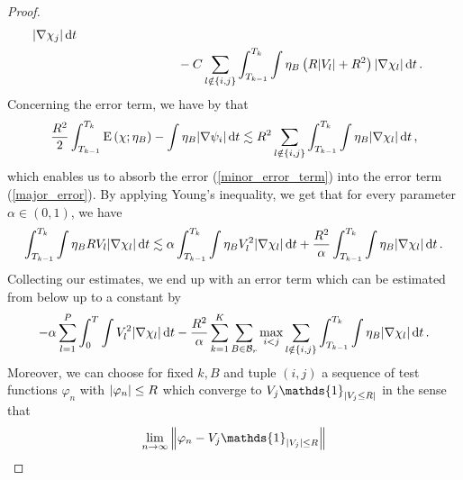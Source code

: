 \begin{proof}
\begin{align}
		\abs{ \nabla \chi_{ j } }
		\dd{ t }
		\\
		\label{major_error}
		& \qquad \qquad \qquad \qquad -
		C \sum_{ l \notin \{ i , j \} }
		\int_{ T_{ k - 1 } }^{ T_{ k } }
			\int
				\eta_{ B } 
				\left(
					R \abs{ V_{ l } }
					+
					R^{ 2 }
				\right)
			\abs{ \nabla \chi_{ l } }
		\dd{ t }.
	\end{align}
	Concerning the error term, we have by  
	that
	\begin{equation*}
				\frac{ R^{ 2 } }{ 2 }
		\int_{ T_{ k - 1 } }^{ T_{ k } }
		\operatorname{E} \left( \chi ; \eta_{ B } \right)
		-
		\int
		\eta_{ B }
		\abs{ \nabla \psi_{ i } }
		\dd{ t }
		\lesssim
		R^{ 2 }
		\sum_{ l \notin \{ i , j \} }
		\int_{ T_{ k - 1 } }^{ T_{ k } }
		\int
		\eta_{ B }
		\abs{ \nabla \chi_{ l } }
		\dd{ t },
	\end{equation*}
	which enables us to absorb the error (\ref{minor_error_term}) into the 
	error term  (\ref{major_error}).
	By applying Young's inequality, we get that for every parameter $ 
	\alpha \in ( 0 , 1 ) $, we have
	\begin{equation*}
		\int_{ T_{ k - 1 } }^{ T_{ k } }
			\int
				\eta_{ B } R V_{ l }
			\abs{ \nabla \chi_{ l } }
		\dd{ t }
		\lesssim
		\alpha
			\int_{ T_{ k - 1 } }^{ T_{ k } }
				\int
					\eta_{ B }
					V_{ l }^{ 2 }
				\abs{ \nabla \chi_{ l } }
			\dd{ t }
		+
		\frac{ R^{ 2 } }{ \alpha }
			\int_{ T_{ k - 1 } }^{ T_{k } }
				\int
					\eta_{ B }
				\abs{ \nabla \chi_{ l } }
			\dd{ t }.
	\end{equation*}
	Collecting our estimates, we end up with an error term which can be 
	estimated from below up to a constant by
	\begin{align*}
		- \alpha \sum_{ l = 1 }^{ P }
			\int_{ 0 }^{ T }
				\int
					V_{ l }^{ 2 }
				\abs{ \nabla \chi_{ l } }
			\dd{ t }
		-
		\frac{ R^{ 2 } }{ \alpha }
		\sum_{ k = 1 }^{ K }
			\sum_{ B \in \mathcal{ B }_{ r } }
				\max_{ i < j }
					\sum_{ l \notin \{ i , j \} }
						\int_{ T_{ k - 1 } }^{ T_{ k } }
							\int
								\eta_{ B }
							\abs{ \nabla \chi_{ l } }
						\dd{ t }.
	\end{align*}
	Moreover, we can choose for fixed $k , B $ and tuple $ (i, j ) $ a sequence 
	of test functions $ \varphi_{ n } $ with $ \abs{ \varphi_{ n } } \leq R $ 
	which converge to $ V_{ j } \mathds{ 1 }_{ \abs{ V_{ j } \leq R } } $
	in the sense that
	\begin{equation*}
		\lim_{ n \to \infty }
		\norm{ \varphi_{ n } - V_{ j } \mathds{ 1 }_{ \abs{ V_{ j } } \leq R } 
}
\end{equation*}
\end{proof}
